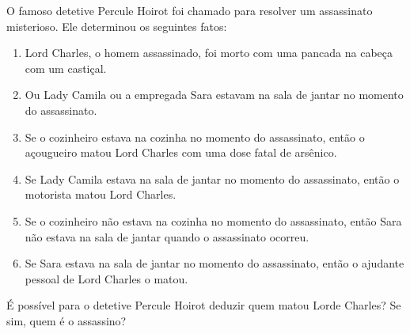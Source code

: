 \item
	O famoso detetive Percule Hoirot foi chamado para resolver um assassinato misterioso. Ele determinou os
seguintes fatos:
\begin{enumerate}
	\item Lord Charles, o homem assassinado, foi morto com uma pancada na cabeça com um castiçal.
	\item  Ou Lady Camila ou a empregada Sara estavam na sala de jantar no momento do assassinato.
	\item Se o cozinheiro estava na cozinha no momento do assassinato, então o açougueiro matou Lord Charles com uma dose fatal de arsênico.
	\item Se Lady Camila estava na sala de jantar no momento do assassinato, então o motorista matou Lord Charles.
	\item Se o cozinheiro não estava na cozinha no momento do assassinato, então Sara não estava na sala de jantar quando o assassinato ocorreu.
		\item Se Sara estava na sala de jantar no momento do assassinato, então o ajudante pessoal de Lord Charles o matou.
\end{enumerate}
É possível para o detetive Percule Hoirot deduzir quem matou Lorde Charles? Se sim, quem é o assassino?
